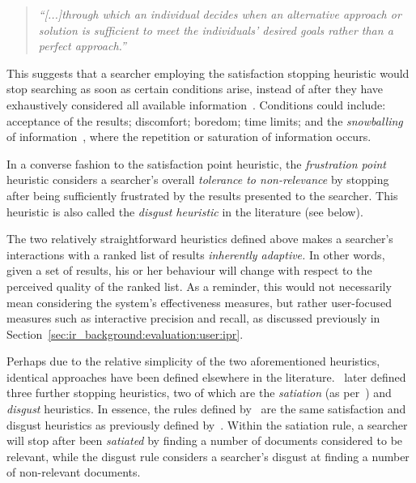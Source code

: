 \begin{quote}
    \emph{``[...]through which an individual decides when an alternative approach or solution is sufficient to meet the individuals' desired goals rather than a perfect approach.''}
\end{quote}

This suggests that a searcher employing the satisfaction stopping heuristic would stop searching as soon as certain conditions arise, instead of after they have exhaustively considered all available information~\citep{march1994primer}. Conditions could include: acceptance of the results; discomfort; boredom; time limits; and the \emph{snowballing} of information~\citep{mansourian2007search}, where the repetition or saturation of information occurs.

In a converse fashion to the satisfaction point heuristic, the \emph{frustration point} heuristic considers a searcher's overall \emph{tolerance to non-relevance} by stopping after being sufficiently frustrated by the results presented to the searcher. This heuristic is also called the \emph{disgust heuristic} in the literature (see below).

The two relatively straightforward heuristics defined above makes a searcher's interactions with a ranked list of results \emph{inherently adaptive.} In other words, given a set of results, his or her behaviour will change with respect to the perceived quality of the ranked list. As a reminder, this would not necessarily mean considering the system's effectiveness measures, but rather user-focused measures such as interactive precision and recall, as discussed previously in Section~\ref{sec:ir_background:evaluation:user:ipr}.

Perhaps due to the relative simplicity of the two aforementioned heuristics, identical approaches have been defined elsewhere in the literature.~\cite{kraft1979stopping_rules} later defined three further stopping heuristics, two of which are the \emph{satiation} (as per~\cite{simon1955satiation}) and \emph{disgust} heuristics. In essence, the rules defined by~\cite{kraft1979stopping_rules} are the same satisfaction and disgust heuristics as previously defined by~\cite{cooper1973retrieval_effectiveness_ii}. Within the satiation rule, a searcher will stop after been \emph{satiated} by finding a number of documents considered to be relevant, while the disgust rule considers a searcher's disgust at finding a number of non-relevant documents.


